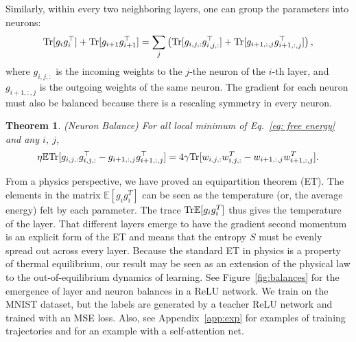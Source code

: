 \documentclass{article}
\theoremstyle{plain}
\newtheorem{theorem}{Theorem}
\newcommand{\E}{\mathbb{E}}
\newcommand{\Tr}{{\rm Tr}}
\begin{document}
Similarly, within every two neighboring layers, one can group the parameters into neurons:
\begin{equation}
    \Tr[g_ig_i^\top] + \Tr[g_{i+1}g_{i+1}^\top] = \sum_j \left(\Tr[g_{i,j,:}g_{i,j,:}^\top] + \Tr[g_{i+1,:, j}g_{i+1,:,j}^\top] \right),
\end{equation}
where $g_{i,j,:}$ is the incoming weights to the $j$-the neuron of the $i$-th layer, and $g_{i+1,:,j}$ is the outgoing weights of the same neuron. The gradient for each neuron must also be balanced because there is a rescaling symmetry in every neuron.

\begin{theorem}\label{theo: neuron balance}
    (Neuron Balance) For all local minimum of 
    Eq.~\eqref{eq: free energy} and any $i,\ j$, 
    \begin{equation}
\eta\mathbb{E}\Tr[g_{i,j,:}g_{i,j,:}^\top-g_{i+1,:, j}g_{i+1,:,j}^\top]=4\gamma\Tr[w_{i,j,:}w_{i,j,:}^T-w_{i+1,:,j}w_{i+1,:,j}^T].
    \end{equation}
\end{theorem}



From a physics perspective, we have proved an equipartition theorem (ET). The elements in the matrix $\E [g_ig_i^T]$ can be seen as the temperature (or, the average energy) felt by each parameter. The trace $ \Tr \E [g_ig_i^T]$ thus gives the temperature of the layer. That different layers emerge to have the gradient second momentum is an explicit form of the ET and means that the entropy $S$ must be evenly spread out across every layer. Because the standard ET in physics is a property of thermal equilibrium, our result may be seen as an extension of the physical law to the out-of-equilibrium dynamics of learning. See Figure~\ref{fig:balances} for the emergence of layer and neuron balances in a ReLU network. We train on the MNIST dataset, but the labels are generated by a teacher ReLU network and trained with an MSE loss. Also, see Appendix~\ref{app:exp} for examples of training trajectories and for an example with a self-attention net.
\end{document}
